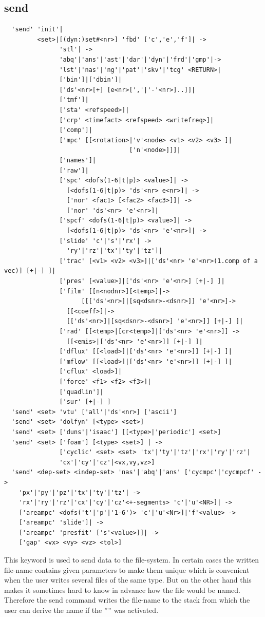 \documentclass{article}
\begin{document}
\subsection{\label{send}send}
\begin{verbatim}
  'send' 'init'|
         <set>|[(dyn:)set#<nr>] 'fbd' ['c','e','f']| ->
               'stl'| ->
               'abq'|'ans'|'ast'|'dar'|'dyn'|'frd'|'gmp'|->
               'lst'|'nas'|'ng'|'pat'|'skv'|'tcg' <RETURN>|
               ['bin']|['dbin']|
               ['ds'<nr>[+] [e<nr>[','|'-'<nr>]..]]|
               ['tmf']|
               ['sta' <refspeed>]|
               ['crp' <timefact> <refspeed> <writefreq>]|
               ['comp']|
               ['mpc' [[<rotation>|'v'<node> <v1> <v2> <v3> ]|
                                  ['n'<node>]]]|
               ['names']|
               ['raw']|
               ['spc' <dofs(1-6|t|p)> <value>]| ->
                 [<dofs(1-6|t|p)> 'ds'<nr> e<nr>]| ->
                 ['nor' <fac1> [<fac2> <fac3>]]| ->
                 ['nor' 'ds'<nr> 'e'<nr>]|
               ['spcf' <dofs(1-6|t|p)> <value>]| ->
                 [<dofs(1-6|t|p)> 'ds'<nr> 'e'<nr>]| ->
               ['slide' 'c'|'s'|'rx'| ->
                 'ry'|'rz'|'tx'|'ty'|'tz']|
               ['trac' [<v1> <v2> <v3>]|['ds'<nr> 'e'<nr>(1.comp of a vec)] [+|-] ]|
               ['pres' [<value>]|['ds'<nr> 'e'<nr>] [+|-] ]|
               ['film' [[n<nodnr>][<temp>]|->
                     [[['ds'<nr>]|[sq<dsnr>-<dsnr>]] 'e'<nr>]->
                 [[<coeff>]|->
                 [['ds'<nr>]|[sq<dsnr>-<dsnr>] 'e'<nr>]] [+|-] ]| 
               ['rad' [[<temp>|[cr<temp>]|['ds'<nr> 'e'<nr>]] ->
                 [[<emis>|['ds'<nr> 'e'<nr>]] [+|-] ]|
               ['dflux' [[<load>]|['ds'<nr> 'e'<nr>]] [+|-] ]|
               ['mflow' [[<load>]|['ds'<nr> 'e'<nr>]] [+|-] ]|
               ['cflux' <load>]| 
               ['force' <f1> <f2> <f3>]|
               ['quadlin']|
               ['sur' [+|-] ]
  'send' <set> 'vtu' ['all'|'ds'<nr>] ['ascii']
  'send' <set> 'dolfyn' [<type> <set>] 
  'send' <set> ['duns'|'isaac'] [[<type>|'periodic'] <set>] 
  'send' <set> ['foam'] [<type> <set>] | ->
               ['cyclic' <set> <set> 'tx'|'ty'|'tz'|'rx'|'ry'|'rz'|
               'cx'|'cy'|'cz'|<vx,vy,vz>] 
  'send' <dep-set> <indep-set> 'nas'|'abq'|'ans' ['cycmpc'|'cycmpcf' ->
    'px'|'py'|'pz'|'tx'|'ty'|'tz'| ->
    'rx'|'ry'|'rz'|'cx'|'cy'|'cz'<+-segments> 'c'|'u'<NR>]| ->
    ['areampc' <dofs('t'|'p'|'1-6')> 'c'|'u'<Nr>]|'f'<value> ->
    ['areampc' 'slide']| ->
    ['areampc' 'presfit' ['s'<value>]]| ->
    ['gap' <vx> <vy> <vz> <tol>] 
\end{verbatim}
This keyword is used to send data to the file-system. In certain cases the written file-name contains given parameters to make them unique which is convenient when the user writes several files of the same type. But on the other hand this makes it sometimes hard to know in advance how the file would be named. Therefore the send command writes the file-name to the stack from which the user can derive the name if the '''' was activated.
\end{document}
